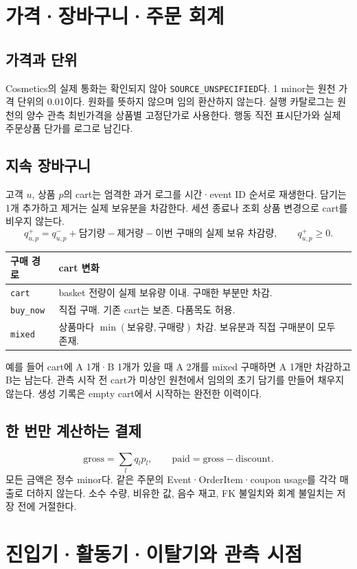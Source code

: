 \documentclass[11pt,a4paper]{article}
\newcommand{\code}[1]{{\ttfamily\footnotesize\nolinkurl{#1}}}
\newcommand{\page}{\clearpage}
\newcommand{\thead}{\rowcolor{pale}}
\begin{document}
\page
\section{가격·장바구니·주문 회계}
\subsection{가격과 단위}
Cosmetics의 실제 통화는 확인되지 않아 \code{SOURCE_UNSPECIFIED}다. 1 minor는 원천 가격 단위의 0.01이다. 원화를 뜻하지 않으며 임의 환산하지 않는다. 실행 카탈로그는 원천의 양수 관측 최빈가격을 상품별 고정단가로 사용한다. 행동 직전 표시단가와 실제 주문상품 단가를 로그로 남긴다.

\subsection{지속 장바구니}
고객 $u$, 상품 $p$의 cart는 엄격한 과거 로그를 시간·event ID 순서로 재생한다. 담기는 1개 추가하고 제거는 실제 보유분을 차감한다. 세션 종료나 조회 상품 변경으로 cart를 비우지 않는다.
\[
q_{u,p}^{+}=q_{u,p}^{-}+\text{담기량}-\text{제거량}-\text{이번 구매의 실제 보유 차감량},\qquad q_{u,p}^{+}\ge0.
\]
\begin{tabularx}{\linewidth}{@{}P{.18\linewidth}Y@{}}\thead 구매 경로 & cart 변화\\\midrule
\code{cart} & basket 전량이 실제 보유량 이내. 구매한 부분만 차감.\\
\code{buy_now} & 직접 구매. 기존 cart는 보존. 다품목도 허용.\\
\code{mixed} & 상품마다 $\min(\text{보유량},\text{구매량})$ 차감. 보유분과 직접 구매분이 모두 존재.\\\bottomrule\end{tabularx}

예를 들어 cart에 A 1개·B 1개가 있을 때 A 2개를 mixed 구매하면 A 1개만 차감하고 B는 남는다. 관측 시작 전 cart가 미상인 원천에서 임의의 초기 담기를 만들어 채우지 않는다. 생성 기록은 empty cart에서 시작하는 완전한 이력이다.

\subsection{한 번만 계산하는 결제}
\[
\mathrm{gross}=\sum_{l}q_l p_l,\qquad
\mathrm{paid}=\mathrm{gross}-\mathrm{discount}.
\]
모든 금액은 정수 minor다. 같은 주문의 Event·OrderItem·coupon usage를 각각 매출로 더하지 않는다. 소수 수량, 비유한 값, 음수 재고, FK 불일치와 회계 불일치는 저장 전에 거절한다.

\page
\section{진입기·활동기·이탈기와 관측 시점}
\end{document}
